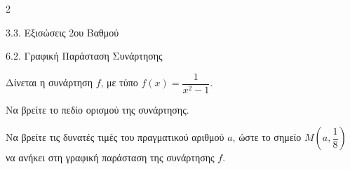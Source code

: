 \begin{ylh}{2}
    \item 3.3. Εξισώσεις 2ου Βαθμού
    \item 6.2. Γραφική Παράσταση Συνάρτησης
\end{ylh}
Δίνεται η συνάρτηση $f$, με τύπο $f(x) = \dfrac{1}{x^2 - 1}$.

\begin{alist}
\item Να βρείτε το πεδίο ορισμού της συνάρτησης.
\item Να βρείτε τις δυνατές τιμές του πραγματικού αριθμού $a$, ώστε το σημείο ${M}\left(a, \dfrac{1}{8}\right)$ να ανήκει στη γραφική παράσταση της συνάρτησης $f$.
\end{alist}


